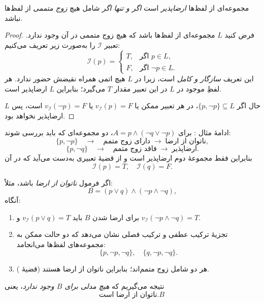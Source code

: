   \begin{theorem}[قضیه \lr{2.60}]
    مجموعه‌ای از لفظ‌ها \emph{ارضاپذیر} است \emph{اگر و تنها اگر} شامل هیچ \emph{زوج متممی} از لفظ‌ها نباشد.
  \end{theorem}
    
  \begin{proof}
    فرض کنید $L$ مجموعه‌ای از لفظ‌ها باشد که هیچ زوج متممی در آن وجود ندارد. تعبیر $\mathscr{I}$ را به‌صورت زیر تعریف می‌کنیم:
    \[
    \mathscr{I}(p)=
    \begin{cases}
    T, & \text{اگر  } p\in L,\\
    F, & \text{اگر  } \neg p\in L.
    \end{cases}
    \]
    این تعریف \emph{سازگار و کامل} است، زیرا در $L$ هیچ اتمی همراه نقیضش حضور ندارد. هر لفظِ موجود در $L$ در این تعبیر مقدار $T$ می‌گیرد؛ بنابراین $L$ ارضاپذیر است.
    
    حال اگر $\{p,\neg p\}\subseteq L$، در هر تعبیر ممکن یا $v_{\mathscr{I}}(p)=F$ یا $v_{\mathscr{I}}(\neg p)=F$ است، پس $L$ ارضاپذیر نخواهد بود.
  \end{proof}
    
  \begin{example}[مثال \lr{2.61}]
    ادامهٔ مثال :  
    برای $A = p\land(\neg q\lor\neg p)$، دو مجموعه‌ای که باید بررسی شوند:
    \[
    \{p,\neg p\}\quad\longrightarrow\quad\text{دارای زوج متمم}\;\to\;\text{ناتوان از ارضا},
    \]
    \[
    \{p,\neg q\}\quad\longrightarrow\quad\text{فاقد زوج متمم}\;\to\;\text{ارضاپذیر}.
    \]
    بنابراین فقط مجموعهٔ دوم ارضاپذیر است و از قضیهٔ  تعبیری به‌دست می‌آید که در آن
    \[
    \mathscr{I}(p)=T,\quad \mathscr{I}(q)=F.
    \]
  \end{example}
    
  \begin{example}[مثال \lr{2.62}]
    اگر فرمول \emph{ناتوان از ارضا} باشد، مثلاً:
    \[
    B = (p\lor q)\land(\neg p\land\neg q),
    \]
    آنگاه:
    \begin{enumerate}
      \item برای ارضا شدن $B$ باید
        $v_{\mathscr{I}}(p\lor q)=T$ و $v_{\mathscr{I}}(\neg p\land\neg q)=T$.
      \item تجزیهٔ ترکیب عطفی و ترکیب فصلی نشان می‌دهد که دو حالت ممکن به مجموعه‌های لفظ‌ها می‌انجامد:
        \[
        \{p,\neg p,\neg q\},\quad \{q,\neg p,\neg q\}.
        \]
      \item هر دو شامل زوج متمم‌اند؛ بنابراین ناتوان از ارضا هستند (قضیهٔ ).
    \end{enumerate}
    نتیجه می‌گیریم که \emph{هیچ مدلی برای $B$ وجود ندارد}، یعنی
    \[
   \text{ناتوان از ارضا است.} B\
    \]
  \end{example}
  
